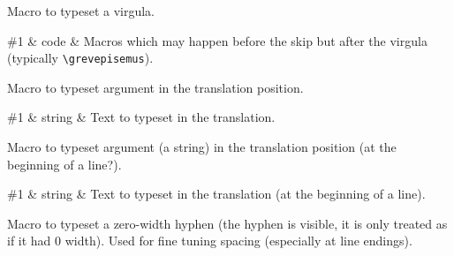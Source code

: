 Macro to typeset a virgula.

\begin{argtable}
  \#1 & code & Macros which may happen before the skip but after the virgula (typically \verb=\grevepisemus=).\\
\end{argtable}

Macro to typeset argument in the translation position.

\begin{argtable}
  \#1 & string & Text to typeset in the translation.\\
\end{argtable}

Macro to typeset argument (a string) in the translation position (at
the beginning of a line?).

\begin{argtable}
  \#1 & string & Text to typeset in the translation (at the beginning of a line).\\
\end{argtable}

Macro to typeset a zero-width hyphen (the hyphen is visible, it is only
treated as if it had 0 width).  Used for fine tuning spacing
(especially at line endings).


